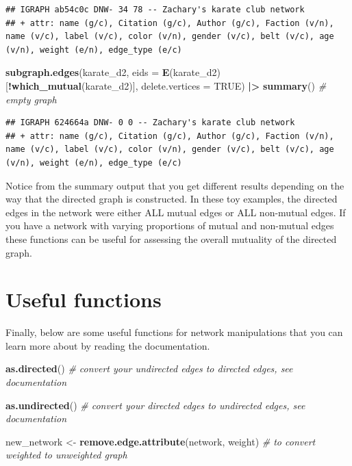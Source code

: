 \documentclass[
]{book}
\newenvironment{Shaded}{\begin{snugshade}}{\end{snugshade}}
\newcommand{\AttributeTok}[1]{\textcolor[rgb]{0.13,0.29,0.53}{#1}}
\newcommand{\CommentTok}[1]{\textcolor[rgb]{0.56,0.35,0.01}{\textit{#1}}}
\newcommand{\ConstantTok}[1]{\textcolor[rgb]{0.56,0.35,0.01}{#1}}
\newcommand{\FunctionTok}[1]{\textcolor[rgb]{0.13,0.29,0.53}{\textbf{#1}}}
\newcommand{\NormalTok}[1]{#1}
\newcommand{\OtherTok}[1]{\textcolor[rgb]{0.56,0.35,0.01}{#1}}
\newcommand{\SpecialCharTok}[1]{\textcolor[rgb]{0.81,0.36,0.00}{\textbf{#1}}}
\newcommand{\StringTok}[1]{\textcolor[rgb]{0.31,0.60,0.02}{#1}}
\begin{document}
\begin{verbatim}
## IGRAPH ab54c0c DNW- 34 78 -- Zachary's karate club network
## + attr: name (g/c), Citation (g/c), Author (g/c), Faction (v/n), name (v/c), label (v/c), color (v/n), gender (v/c), belt (v/c), age (v/n), weight (e/n), edge_type (e/c)
\end{verbatim}

\begin{Shaded}
\begin{Highlighting}[]
\FunctionTok{subgraph.edges}\NormalTok{(karate\_d2, }\AttributeTok{eids =} \FunctionTok{E}\NormalTok{(karate\_d2)[}\SpecialCharTok{!}\FunctionTok{which\_mutual}\NormalTok{(karate\_d2)], }\AttributeTok{delete.vertices =} \ConstantTok{TRUE}\NormalTok{) }\SpecialCharTok{|\textgreater{}} 
  \FunctionTok{summary}\NormalTok{() }\CommentTok{\# empty graph}
\end{Highlighting}
\end{Shaded}

\begin{verbatim}
## IGRAPH 624664a DNW- 0 0 -- Zachary's karate club network
## + attr: name (g/c), Citation (g/c), Author (g/c), Faction (v/n), name (v/c), label (v/c), color (v/n), gender (v/c), belt (v/c), age (v/n), weight (e/n), edge_type (e/c)
\end{verbatim}

Notice from the summary output that you get different results depending on the way that the directed graph is constructed. In these toy examples, the directed edges in the network were either ALL mutual edges or ALL non-mutual edges. If you have a network with varying proportions of mutual and non-mutual edges these functions can be useful for assessing the overall mutuality of the directed graph.

\section{Useful functions}\label{useful-functions}

Finally, below are some useful functions for network manipulations that you can learn more about by reading the documentation.

\begin{Shaded}
\begin{Highlighting}[]
\FunctionTok{as.directed}\NormalTok{() }\CommentTok{\# convert your undirected edges to directed edges, see documentation }

\FunctionTok{as.undirected}\NormalTok{() }\CommentTok{\# convert your directed edges to undirected edges, see documentation }

\NormalTok{new\_network }\OtherTok{\textless{}{-}} \FunctionTok{remove.edge.attribute}\NormalTok{(network, }\StringTok{\textquotesingle{}weight\textquotesingle{}}\NormalTok{) }\CommentTok{\# to convert weighted to unweighted graph }
\end{Highlighting}
\end{Shaded}
\end{document}
